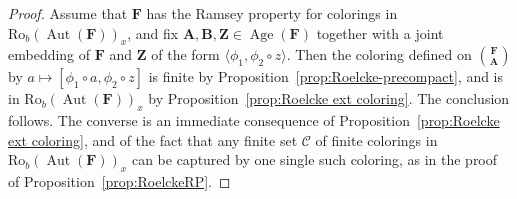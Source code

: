 \documentclass[10pt,a4paper]{article}
\theoremstyle{definition}
\numberwithin{equation}{section}
\numberwithin{figure}{section}
\numberwithin{table}{section}
\newcommand*{\mA}{\mathbf{A}}
\newcommand*{\mB}{\mathbf{B}}
\newcommand*{\mF}{\mathbf{F}}
\newcommand*{\mZ}{\mathbf{Z}}
\DeclareMathOperator{\Aut}{Aut}
\DeclareMathOperator{\Age}{Age}
\newcommand{\ROB}{\mathrm{Ro}_{b}}
\begin{document}
\begin{proof}
Assume that $\mF$ has the Ramsey property for colorings in $\ROB(\Aut(\mF))_{x}$, and fix $\mA, \mB, \mZ\in \Age(\mF)$ together with a joint embedding of $\mF$ and $\mZ$ of the form $\langle \phi_{1}, \phi_{2}\circ z\rangle$. Then the coloring defined on $\binom{\mF}{\mA}$ by $a\mapsto [\phi_{1} \circ a,\phi_{2}\circ z]$ is finite by Proposition~\ref{prop:Roelcke-precompact}, and is in $\ROB(\Aut(\mF))_{x}$ by Proposition~\ref{prop:Roelcke ext coloring}. The conclusion follows. The converse is an immediate consequence of Proposition~\ref{prop:Roelcke ext coloring}, and of the fact that any finite set $\mathcal C$ of finite colorings in $\ROB(\Aut(\mF))_{x}$ can be captured by one single such coloring, as in the proof of Proposition~\ref{prop:RoelckeRP}.
\end{proof}
\end{document}
